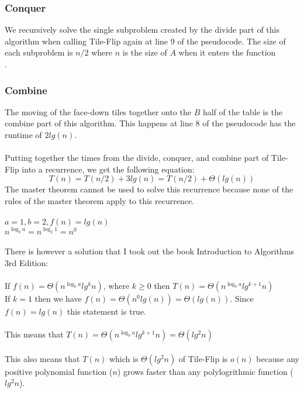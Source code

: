 \documentclass[12pt]{article}
\begin{document}
\subsubsection*{Conquer}
We recursively solve the single subproblem created by the divide part of this algorithm when calling Tile-Flip again at line 9 of the pseudocode.  The size of each subproblem is $n/2$ where $n$ is the size of $A$ when it enters the function\\.   
\subsubsection*{Combine}
The moving of the face-down tiles together onto the $B$ half of the table is the combine part of this algorithm.  This happens at line 8 of the pseudocode has the runtime of $2lg(n)$.\\
\\
\noindent
Putting together the times from the divide, conquer, and combine part of Tile-Flip into a recurrence, we get the following equation:
$$
T(n) = T(n/2) + 3lg(n) = T(n/2) + \Theta{(lg(n))}
$$
The master theorem cannot be used to solve this recurrence because none of the rules of the master theorem apply to this recurrence.\\
\\
$a=1, b=2, f(n) = lg(n)$\\
$n^{\log_{b} a} = n^{\log_{2} 1} = n^0$\\
\\
There is however a solution that I took out the book Introduction to Algorithms 3rd Edition:\\
\\
If $f(n) = \Theta{(n^{\log_{b} a}lg^k n)}$, where $k \ge 0$ then $T(n) = \Theta{(n^{\log_{b} a}lg^{k+1} n)}$\\
If $k=1$ then we have $f(n) = \Theta{(n^0lg(n))} = \Theta{(lg(n))}$.  Since $f(n) = lg(n)$ this statement is true.\\
\\
This means that $T(n) = \Theta{(n^{\log_{b} a}lg^{k+1} n)} = \Theta{(lg^{2} n)}$\\
\\
This also means that $T(n)$ which is $ \Theta{(lg^{2} n)}$ of Tile-Flip is $o(n)$ because any positive polynomial function ($n$) grows faster than any polylogrithmic function ($lg^2 n$).
\end{document}
